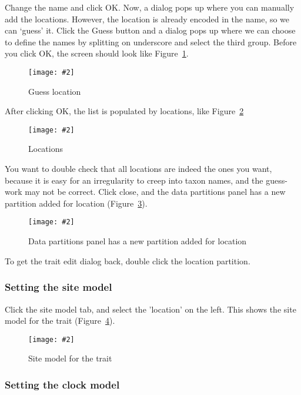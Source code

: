 \documentclass{article}
\newcommand{\includeimage}[2][]{%
\texttt{[image: \#2]}
}
\begin{document}
Change the name and click OK. Now, a dialog pops up where you can manually add the locations. However, the location is already encoded in the name, so we can `guess' it. Click the Guess button and a dialog pops up where we can choose to define the names by splitting on underscore and select the third group. Before you click OK, the screen should look like Figure~\ref{fig.BEAUti_trait3}.

\begin{figure}
\centering	
\includeimage[scale=0.3]{figures/BEAUti_trait3}
\caption{Guess location}
\label{fig.BEAUti_trait3}
\end{figure}

After clicking OK, the list is populated by locations, like Figure~\ref{fig.BEAUti_trait4}

\begin{figure}
\centering	
\includeimage[scale=0.3]{figures/BEAUti_trait4}
\caption{Locations}
\label{fig.BEAUti_trait4}
\end{figure}

You want to double check that all locations are indeed the ones you want, because it is easy for an irregularity to creep into taxon names, and the guess-work may not be correct.
Click close, and the data partitions panel has a new partition added for location (Figure~\ref{fig.BEAUti_DataPartitions2}).

\begin{figure}
\centering	
\includeimage[scale=0.3]{figures/BEAUti_DataPartitions2}
\caption{Data partitions panel has a new partition added for location}
\label{fig.BEAUti_DataPartitions2}
\end{figure}

To get the trait edit dialog back, double click the location partition.

\subsubsection*{Setting the site model}

Click the site model tab, and select the 'location' on the left.
This shows the site model for the trait (Figure~\ref{fig.BEAUti_sitemodel2}).

\begin{figure}
\centering	
\includeimage[scale=0.3,clip=true,trim=0 400 0 0]{figures/BEAUti_sitemodel2}
\caption{Site model for the trait}
\label{fig.BEAUti_sitemodel2}
\end{figure}


\subsubsection*{Setting the clock model}
\end{document}
